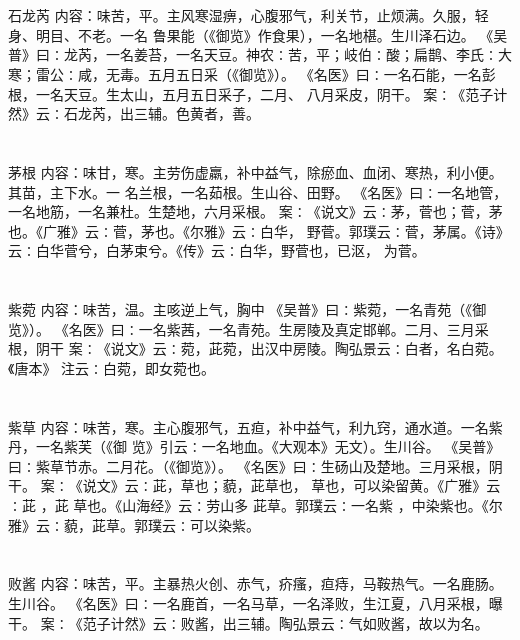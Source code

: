 \documentclass[12pt,UTF8]{ctexbook}
\begin{document}
\chapter{}石龙芮
内容：味苦，平。主风寒湿痹，心腹邪气，利关节，止烦满。久服，轻身、明目、不老。一名 
鲁果能（《御览》作食果），一名地椹。生川泽石边。 
《吴普》曰∶龙芮，一名姜苔，一名天豆。神农∶苦，平；岐伯∶酸；扁鹊、李氏∶大 
寒；雷公∶咸，无毒。五月五日采（《御览》）。 
《名医》曰∶一名石能，一名彭根，一名天豆。生太山，五月五日采子，二月、 
八月采皮，阴干。 
案∶《范子计然》云∶石龙芮，出三辅。色黄者，善。 


\chapter{}茅根
内容：味甘，寒。主劳伤虚羸，补中益气，除瘀血、血闭、寒热，利小便。其苗，主下水。一 
名兰根，一名茹根。生山谷、田野。 
《名医》曰∶一名地管，一名地筋，一名兼杜。生楚地，六月采根。 
案∶《说文》云∶茅，菅也；菅，茅也。《广雅》云∶菅，茅也。《尔雅》云∶白华， 
野菅。郭璞云∶菅，茅属。《诗》云∶白华菅兮，白茅束兮。《传》云∶白华，野菅也，已沤， 
为菅。 


\chapter{}紫菀
内容：味苦，温。主咳逆上气，胸中 
《吴普》曰∶紫菀，一名青苑（《御览》）。 
《名医》曰∶一名紫茜，一名青苑。生房陵及真定邯郸。二月、三月采根，阴干 
案∶《说文》云∶菀，茈菀，出汉中房陵。陶弘景云∶白者，名白菀。《唐本》 
注云∶白菀，即女菀也。 


\chapter{}紫草
内容：味苦，寒。主心腹邪气，五疸，补中益气，利九窍，通水道。一名紫丹，一名紫芙（《御 
览》引云∶一名地血。《大观本》无文）。生川谷。 
《吴普》曰∶紫草节赤。二月花。（《御览》）。 
《名医》曰∶生砀山及楚地。三月采根，阴干。 
案∶《说文》云∶茈，草也；藐，茈草也， 草也，可以染留黄。《广雅》云∶茈 ，茈 
草也。《山海经》云∶劳山多 
茈草。郭璞云∶一名紫 ，中染紫也。《尔雅》云∶藐，茈草。郭璞云∶可以染紫。 


\chapter{}败酱
内容：味苦，平。主暴热火创、赤气，疥瘙，疸痔，马鞍热气。一名鹿肠。生川谷。 
《名医》曰∶一名鹿首，一名马草，一名泽败，生江夏，八月采根，曝干。 
案∶《范子计然》云∶败酱，出三辅。陶弘景云∶气如败酱，故以为名。 
\end{document}
